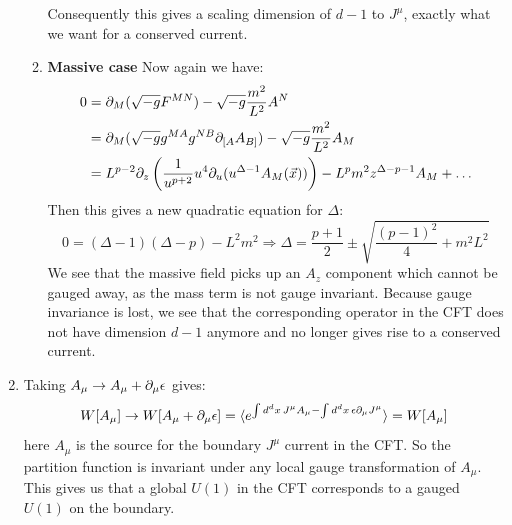 \documentclass[11pt, class=article, crop=false]{standalone}
\begin{document}
\begin{enumerate}
\begin{enumerate}
		
		Consequently this gives a scaling dimension of $d-1$ to $J^\mu$, exactly what we want for a conserved current. 
		
		\item \textbf{Massive case} Now again we have:
		\[
		\begin{aligned}
			0 &= \partial_M (\sqrt{-g} F^{MN}) - \sqrt{-g} \frac{m^2}{L^2} A^N\\
			& = \partial_M (\sqrt{-g} g^{MA} g^{NB} \partial_{\small[ A} A_{B\small]}) - \sqrt{-g} \frac{m^2}{L^2} A_M\\
			& = L^{p-2} \partial_{z} \left( \frac{1}{u^{p+2}} u^{4} \partial_u (u^{\Delta-1} A_M(\vec x)) \right) - L^{p} m^2 z^{\Delta-p-1} A_M + \dots
		\end{aligned}
		\]
		Then this gives a new quadratic equation for $\Delta$:
		\[
			0 = (\Delta - 1) (\Delta - p) - L^2 m^2 \Rightarrow \Delta = \frac{p+1}{2} \pm \sqrt{\frac{(p-1)^2}{4} + m^2 L^2}
		\]
		We see that the massive field picks up an $A_z$ component which cannot be gauged away, as the mass term is not gauge invariant. Because gauge invariance is lost, we see that the corresponding operator in the CFT does not have dimension $d-1$ anymore and no longer gives rise to a conserved current.
		
	\end{enumerate}
	
	\item Taking $A_\mu \to A_\mu + \partial_\mu \epsilon$ gives:
	\[
		W[A_\mu] \to W[A_\mu + \partial_\mu \epsilon] = \braket{e^{\int d^d x\, J^\mu A_\mu - \int d^d x\, \epsilon \partial_\mu J^\mu }} = W[A_\mu]
	\]
	here $A_\mu$ is the source for the boundary $J^\mu$ current in the CFT. So the partition function is invariant under any local gauge transformation of $A_\mu$. This gives us that a global $U(1)$ in the CFT corresponds to a gauged $U(1)$ on the boundary.
	

\end{enumerate}
\end{document}
